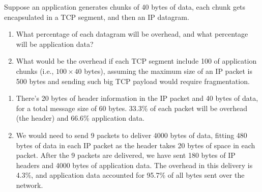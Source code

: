 \documentclass{report}
\begin{document}
\mktitle


\begin{problem}

Suppose an application generates chunks of 40 bytes of data, each chunk gets encapsulated in a TCP segment, and then an IP datagram.

\begin{enumerate}
\item What percentage of each datagram will be overhead, and what percentage will be application data?

\item What would be the overhead if each TCP segment include 100 of application chunks (i.e., $100 \times 40$ bytes), assuming the maximum size of an IP packet is 500 bytes and sending such big TCP payload would require fragmentation.
\end{enumerate}


\begin{answer}{40em}
  \begin{enumerate}
    \item There's 20 bytes of header information in the IP packet and 40 bytes
          of data, for a total message size of 60 bytes. 33.3\% of each packet
          will be overhead (the header) and 66.6\% application data.

    \item We would need to send 9 packets to deliver 4000 bytes of data, fitting
          480 bytes of data in each IP packet as the header takes 20 bytes of
          space in each packet. After the 9 packets are delivered, we have sent
          180 bytes of IP headers and 4000 bytes of application data. The
          overhead in this delivery is 4.3\%, and application data accounted for
          95.7\% of all bytes sent over the network.
  \end{enumerate}
\end{answer}

\end{problem}
\end{document}
